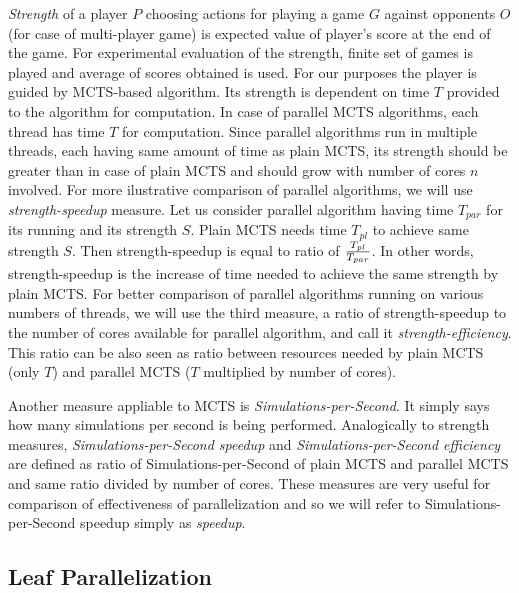 \emph{Strength} of a player $P$ choosing actions for playing a game $G$ against
opponents $O$ (for case of multi-player game) 
is expected value of player's score at the end of the game. For experimental evaluation of the
strength, finite set of games is played and average of scores obtained is used. For our
purposes the player is guided by MCTS-based algorithm. Its strength is dependent on time $T$
provided to the algorithm for computation. In case of parallel MCTS algorithms, each thread has
time $T$ for computation. Since parallel algorithms run in multiple threads, each having same
amount of time as plain MCTS, its strength should be greater than in case of plain MCTS and should 
grow with number of cores $n$ involved. For more ilustrative comparison of parallel algorithms,
we will use \emph{strength-speedup} measure. Let us consider parallel algorithm having time
$T_{par}$
for its running and its strength $S$. Plain MCTS needs time $T_{pl}$ to achieve same strength
$S$. Then strength-speedup is equal to ratio of $T_{pl} \over T_{par}$. In other words,
strength-speedup is the increase of time needed to achieve the same strength by plain MCTS.
For better comparison of parallel algorithms running on various numbers of threads, we will use 
the third measure, a ratio of strength-speedup to the number of cores available for parallel
algorithm, and call it \emph{strength-efficiency}. This ratio can be also seen as ratio between
resources needed by plain MCTS (only $T$) and parallel MCTS ($T$ multiplied by number of
cores).

Another measure appliable to MCTS is \emph{Simulations-per-Second}. It simply says how many
simulations per second is being performed. Analogically to strength measures,
\emph{Simulations-per-Second speedup} and \emph{Simulations-per-Second efficiency} are defined
as ratio of Simulations-per-Second of plain MCTS and parallel MCTS and same ratio divided by
number of cores. These measures are very useful for comparison of effectiveness of
parallelization and so we will refer to Simulations-per-Second speedup simply as
\emph{speedup}. 





\subsection{Leaf Parallelization}
\label{sec_leaf_parallelization}

